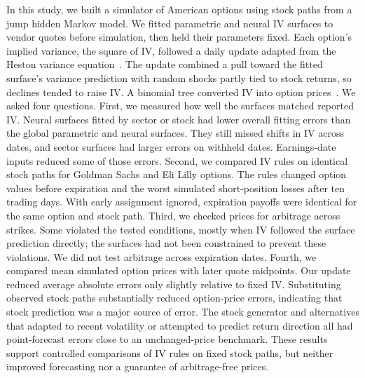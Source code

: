 In this study, we built a simulator of American options using stock paths from a jump hidden Markov model. We fitted parametric and neural IV surfaces to vendor quotes before simulation, then held their parameters fixed. Each option's implied variance, the square of IV, followed a daily update adapted from the Heston variance equation~\citep{heston1993}. The update combined a pull toward the fitted surface's variance prediction with random shocks partly tied to stock returns, so declines tended to raise IV. A binomial tree converted IV into option prices~\citep{cox1979,leisen1996}. We asked four questions. First, we measured how well the surfaces matched reported IV. Neural surfaces fitted by sector or stock had lower overall fitting errors than the global parametric and neural surfaces. They still missed shifts in IV across dates, and sector surfaces had larger errors on withheld dates. Earnings-date inputs reduced some of those errors. Second, we compared IV rules on identical stock paths for Goldman Sachs and Eli Lilly options. The rules changed option values before expiration and the worst simulated short-position losses after ten trading days. With early assignment ignored, expiration payoffs were identical for the same option and stock path. Third, we checked prices for arbitrage across strikes. Some violated the tested conditions, mostly when IV followed the surface prediction directly; the surfaces had not been constrained to prevent these violations. We did not test arbitrage across expiration dates. Fourth, we compared mean simulated option prices with later quote midpoints. Our update reduced average absolute errors only slightly relative to fixed IV. Substituting observed stock paths substantially reduced option-price errors, indicating that stock prediction was a major source of error. The stock generator and alternatives that adapted to recent volatility or attempted to predict return direction all had point-forecast errors close to an unchanged-price benchmark. These results support controlled comparisons of IV rules on fixed stock paths, but neither improved forecasting nor a guarantee of arbitrage-free prices.
